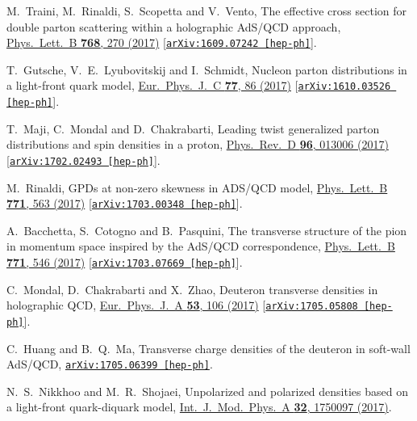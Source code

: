 \documentclass[aps,prd,preprint,groupedaddress]{revtex4-1}
\begin{document}
\begin{thebibliography}{99}
  M.~Traini, M.~Rinaldi, S.~Scopetta and V.~Vento,
  The effective cross section for double parton scattering within a holographic AdS/QCD approach,
  \href{http://www.sciencedirect.com/science/article/pii/S0370269317301740?via%3Dihub}{Phys.\ Lett.\ B {\bf 768}, 270 (2017)}
  [\href{https://arxiv.org/abs/1609.07242}{\tt arXiv:1609.07242 [hep-ph]}].


  T.~Gutsche, V.~E.~Lyubovitskij and I.~Schmidt,
  Nucleon parton distributions in a light-front quark model,
  \href{https://link.springer.com/article/10.1140%2Fepjc%2Fs10052-017-4648-5}{Eur.\ Phys.\ J.\ C {\bf 77},  86 (2017)}
  [\href{https://arxiv.org/abs/1610.03526}{\tt arXiv:1610.03526 [hep-ph]}].


  T.~Maji, C.~Mondal and D.~Chakrabarti,
  Leading twist generalized parton distributions and spin densities in a proton,
  \href{https://journals.aps.org/prd/abstract/10.1103/PhysRevD.96.013006}{Phys.\ Rev.\ D {\bf 96},  013006 (2017)}
  [\href{https://arxiv.org/abs/1702.02493}{\tt arXiv:1702.02493 [hep-ph]}].


  M.~Rinaldi,
  GPDs at non-zero skewness in ADS/QCD model,
  \href{http://www.sciencedirect.com/science/article/pii/S0370269317304707?via%3Dihub}{Phys.\ Lett.\ B {\bf 771}, 563 (2017)}
  [\href{https://arxiv.org/abs/1703.00348}{\tt arXiv:1703.00348 [hep-ph]}].


  A.~Bacchetta, S.~Cotogno and B.~Pasquini,
  The transverse structure of the pion in momentum space inspired by the AdS/QCD correspondence,
  \href{http://www.sciencedirect.com/science/article/pii/S0370269317304355?via%3Dihub}{Phys.\ Lett.\ B {\bf 771}, 546 (2017)}
  [\href{https://arxiv.org/abs/1703.07669}{\tt arXiv:1703.07669 [hep-ph]}].


  C.~Mondal, D.~Chakrabarti and X.~Zhao,
  Deuteron transverse densities in holographic QCD,
  \href{https://link.springer.com/article/10.1140%2Fepja%2Fi2017-12292-7}{Eur.\ Phys.\ J.\ A {\bf 53}, 106 (2017)}
  [\href{https://arxiv.org/abs/1705.05808}{\tt arXiv:1705.05808 [hep-ph]}].


  C.~Huang and B.~Q.~Ma,
  Transverse charge densities of the deuteron in soft-wall AdS/QCD,
  \href{https://arxiv.org/abs/1705.06399}{\tt arXiv:1705.06399 [hep-ph]}.


  N.~S.~Nikkhoo and M.~R.~Shojaei,
  Unpolarized and polarized densities based on a light-front quark-diquark model,
  \href{http://www.worldscientific.com/doi/abs/10.1142/S0217751X1750097X}{Int.\ J.\ Mod.\ Phys.\ A {\bf 32},  1750097 (2017)}.
  

\end{thebibliography}
\end{document}
